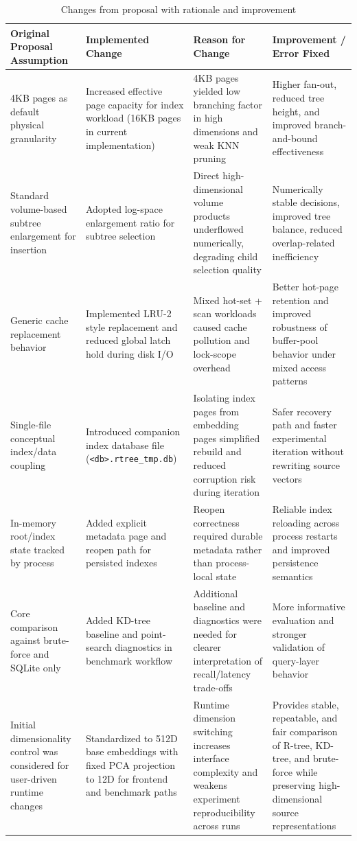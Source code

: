 \documentclass[11pt,a4paper]{article}
\begin{document}
\begin{table}[H]
\centering
\caption{Changes from proposal with rationale and improvement}
\label{tab:proposal-changes}
\begin{tabular}{p{}p{}p{}p{}}
\toprule
Original Proposal Assumption & Implemented Change & Reason for Change & Improvement / Error Fixed \\
\midrule
4KB pages as default physical granularity & Increased effective page capacity for index workload (16KB pages in current implementation) & 4KB pages yielded low branching factor in high dimensions and weak KNN pruning & Higher fan-out, reduced tree height, and improved branch-and-bound effectiveness \\
\midrule
Standard volume-based subtree enlargement for insertion & Adopted log-space enlargement ratio for subtree selection & Direct high-dimensional volume products underflowed numerically, degrading child selection quality & Numerically stable decisions, improved tree balance, reduced overlap-related inefficiency \\
\midrule
Generic cache replacement behavior & Implemented LRU-2 style replacement and reduced global latch hold during disk I/O & Mixed hot-set + scan workloads caused cache pollution and lock-scope overhead & Better hot-page retention and improved robustness of buffer-pool behavior under mixed access patterns \\
\midrule
Single-file conceptual index/data coupling & Introduced companion index database file (\texttt{<db>.rtree\_tmp.db}) & Isolating index pages from embedding pages simplified rebuild and reduced corruption risk during iteration & Safer recovery path and faster experimental iteration without rewriting source vectors \\
\midrule
In-memory root/index state tracked by process & Added explicit metadata page and reopen path for persisted indexes & Reopen correctness required durable metadata rather than process-local state & Reliable index reloading across process restarts and improved persistence semantics \\
\midrule
Core comparison against brute-force and SQLite only & Added KD-tree baseline and point-search diagnostics in benchmark workflow & Additional baseline and diagnostics were needed for clearer interpretation of recall/latency trade-offs & More informative evaluation and stronger validation of query-layer behavior \\
\midrule
Initial dimensionality control was considered for user-driven runtime changes & Standardized to 512D base embeddings with fixed PCA projection to 12D for frontend and benchmark paths & Runtime dimension switching increases interface complexity and weakens experiment reproducibility across runs & Provides stable, repeatable, and fair comparison of R-tree, KD-tree, and brute-force while preserving high-dimensional source representations \\

\end{tabular}
\end{table}
\end{document}
